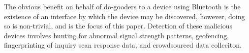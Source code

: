 The obvious benefit on behalf of do-gooders to a device using Bluetooth is
the existence of an interface by which the device may be discovered, however,
doing so is non-trivial, and is the focus of this paper. Detection of these
malicious devices involves hunting for abnormal signal strength patterns,
geofencing, fingerprinting of inquiry scan response data, and crowdsourced
data colleciton.